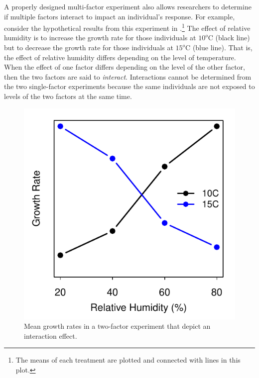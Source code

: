 \documentclass[10pt,openany]{book}\usepackage[]{graphicx}\usepackage[]{color}
\newenvironment{knitrout}{}{} %
\begin{document}

A properly designed multi-factor experiment also allows researchers to determine if multiple factors interact to impact an individual's response.  For example, consider the hypothetical results from this experiment in .\footnote{The means of each treatment are plotted and connected with lines in this plot.}  The effect of relative humidity is to increase the growth rate for those individuals at $10^{o}$C (black line) but to decrease the growth rate for those individuals at $15^{o}$C (blue line).  That is, the effect of relative humidity differs depending on the level of temperature.  When the effect of one factor differs depending on the level of the other factor, then the two factors are said to \textit{interact}.  Interactions cannot be determined from the two single-factor experiments because the same individuals are not exposed to levels of the two factors at the same time.

\begin{knitrout}
\color{fgcolor}\begin{figure}[hbtp]

{\centering \includegraphics[width=.4\linewidth]{Figs/ExpDInt-1} 

}

\caption[Mean growth rates in a two-factor experiment that depict an interaction effect]{Mean growth rates in a two-factor experiment that depict an interaction effect.}\label{fig:ExpDInt}
\end{figure}


\end{knitrout}
\vspace{9pt} %
\end{document}

